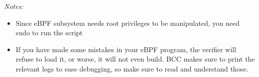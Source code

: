 {\em Notes:
\begin{itemize}
    \item Since eBPF subsystem needs root privileges to be manipulated, you need sudo to run the script
    \item If you have made some mistakes in your eBPF program, the verifier
    will refuse to load it, or worse, it will not even build. BCC makes sure to
    print the relevant logs to ease debugging, so make sure to read
    and understand those.
\end{itemize}}

